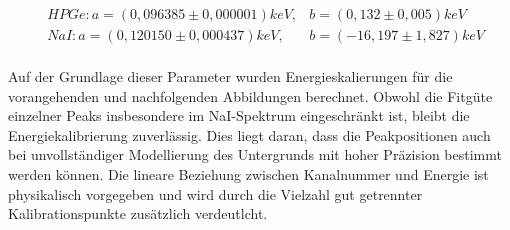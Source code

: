 \begin{align*}
    &HPGe: a = (0,096385 \pm 0,000001)keV, &b =(0,132 \pm 0,005) keV\\
    &NaI: a = (0,120150 \pm 0,000437) keV, &b =(-16,197 \pm 1,827) keV\\
\end{align*}
\label{energiekalwerte}

Auf der Grundlage dieser Parameter wurden Energieskalierungen für die vorangehenden und nachfolgenden Abbildungen berechnet. %
Obwohl die Fitgüte einzelner Peaks insbesondere im NaI-Spektrum eingeschränkt ist, bleibt die Energiekalibrierung zuverlässig. Dies liegt daran, dass die Peakpositionen auch bei unvollständiger Modellierung des Untergrunds mit hoher Präzision bestimmt werden können. Die lineare Beziehung zwischen Kanalnummer und Energie ist physikalisch vorgegeben und wird durch die Vielzahl gut getrennter Kalibrationspunkte zusätzlich verdeutlcht. 
